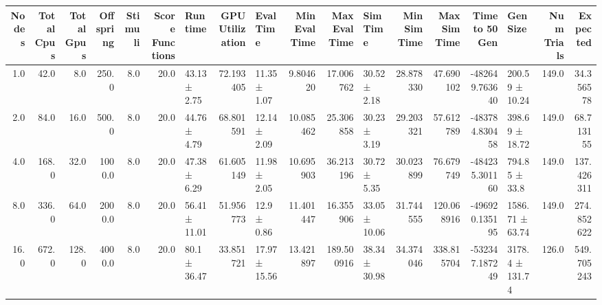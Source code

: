 \begin{tabular}{rrrrrrlrlrrlrrrlrr}
\toprule
 Nodes &  Total Cpus &  Total Gpus &  Offspring &  Stimuli &  Score Functions &       Runtime &  GPU Utilization &     Eval Time &  Min Eval Time &  Max Eval Time &      Sim Time &  Min Sim Time &  Max Sim Time &  Time to 50 Gen &        Gen Size &  Num Trials &   Expected \\
\midrule
   1.0 &        42.0 &         8.0 &      250.0 &      8.0 &             20.0 &  43.13 ± 2.75 &        72.193405 &  11.35 ± 1.07 &       9.804620 &      17.006762 &  30.52 ± 2.18 &     28.878330 &     47.690102 &  -482649.763640 &  200.59 ± 10.24 &       149.0 &  34.356578 \\
   2.0 &        84.0 &        16.0 &      500.0 &      8.0 &             20.0 &  44.76 ± 4.79 &        68.801591 &  12.14 ± 2.09 &      10.085462 &      25.306858 &  30.23 ± 3.19 &     29.203321 &     57.612789 &  -483784.830458 &  398.69 ± 18.72 &       149.0 &  68.713155 \\
   4.0 &       168.0 &        32.0 &     1000.0 &      8.0 &             20.0 &  47.38 ± 6.29 &        61.605149 &  11.98 ± 2.05 &      10.695903 &      36.213196 &  30.72 ± 5.35 &     30.023899 &     76.679749 &  -484235.301160 &   794.85 ± 33.8 &       149.0 & 137.426311 \\
   8.0 &       336.0 &        64.0 &     2000.0 &      8.0 &             20.0 & 56.41 ± 11.01 &        51.956773 &   12.9 ± 0.86 &      11.401447 &      16.355906 & 33.05 ± 10.06 &     31.744555 &    120.068916 &  -496920.135195 & 1586.71 ± 63.74 &       149.0 & 274.852622 \\
  16.0 &       672.0 &       128.0 &     4000.0 &      8.0 &             20.0 &  80.1 ± 36.47 &        33.851721 & 17.97 ± 15.56 &      13.421897 &     189.500916 & 38.34 ± 30.98 &     34.374046 &    338.815704 &  -532347.187249 & 3178.4 ± 131.74 &       126.0 & 549.705243 \\
\bottomrule
\end{tabular}
